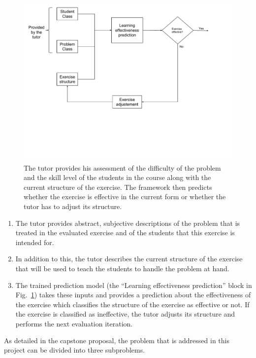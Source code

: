 \begin{figure}
	\centering
	\includegraphics[width=\textwidth]{./img/vision.pdf}
	\vspace{-3.5cm}
	\caption{The tutor provides his assessment of the difficulty of the problem and the skill level of the students in the course along with the current structure of the exercise. The framework then predicts whether the exercise is effective in the current form or whether the tutor has to adjust its structure.\label{fig_vision}}
\end{figure}

\begin{enumerate}
	\item The tutor provides abstract, subjective descriptions of the problem that is treated in the evaluated exercise and of the students that this exercise is intended for.
	\item In addition to this, the tutor describes the current structure of the exercise that will be used to teach the students to handle the problem at hand.
	\item The trained prediction model (the “Learning effectiveness prediction” block in Fig.~\ref{fig_vision}) takes these inputs and provides a prediction about the effectiveness of the exercise which classifies the structure of the exercise as effective or not. If the exercise is classified as ineffective, the tutor adjusts its structure and performs the next evaluation iteration.
\end{enumerate}

As detailed in the capstone proposal, the problem that is addressed in this project can be divided into three subproblems. 

